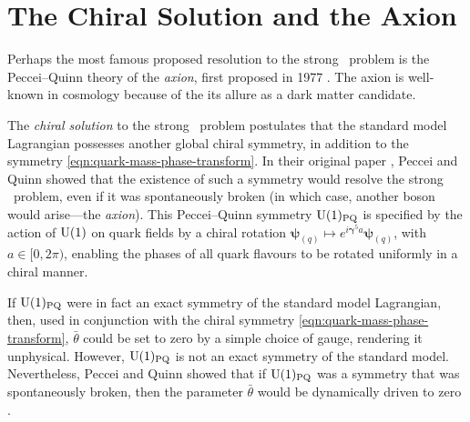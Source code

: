 

\section{The Chiral Solution and the Axion}


Perhaps the most famous proposed resolution to the strong \CP\ problem is the Peccei--Quinn theory of the \emph{axion}, first proposed in 1977 \cite{PecceiQuinn_1977}.
The axion is well-known in cosmology because of the its allure as a dark matter candidate.


The \emph{chiral solution} to the strong \CP\ problem postulates that the standard model Lagrangian possesses another global chiral symmetry, in addition to the symmetry \eqref{eqn:quark-mass-phase-transform}.
In their original paper \cite{PecceiQuinn_1977}, Peccei and Quinn showed that the existence of such a symmetry would resolve the strong \CP\ problem, even if it was spontaneously broken (in which case, another boson would arise---the \emph{axion}).
This Peccei--Quinn symmetry $\mathrm{U}(1)_\text{PQ}$ is specified by the action of $\mathrm{U}(1)$ on quark fields by a chiral rotation $\bm ψ_{(q)} \mapsto e^{i\bm γ^5 a}\bm ψ_{(q)}$, with $a \in [0, 2π)$, enabling the phases of all quark flavours to be rotated uniformly in a chiral manner.

If $\mathrm{U}(1)_\text{PQ}$ were in fact an exact symmetry of the standard model Lagrangian, then, used in conjunction with the chiral symmetry \eqref{eqn:quark-mass-phase-transform}, $\bar θ$ could be set to zero by a simple choice of gauge, rendering it unphysical. 
However, $\mathrm{U}(1)_\text{PQ}$ is not an exact symmetry of the standard model.
Nevertheless, Peccei and Quinn showed that if $\mathrm{U}(1)_\text{PQ}$ was a symmetry that was spontaneously broken, then the parameter $\bar θ$ would be dynamically driven to zero \cite{Peccei_1996}.

